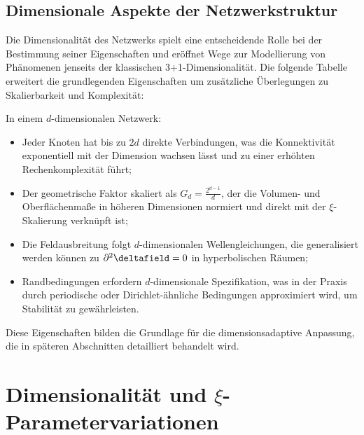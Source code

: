 \subsection{Dimensionale Aspekte der Netzwerkstruktur}
\label{subsec:dimensional_aspects}
Die Dimensionalität des Netzwerks spielt eine entscheidende Rolle bei der Bestimmung seiner Eigenschaften und eröffnet Wege zur Modellierung von Phänomenen jenseits der klassischen 3+1-Dimensionalität. Die folgende Tabelle erweitert die grundlegenden Eigenschaften um zusätzliche Überlegungen zu Skalierbarkeit und Komplexität:
\begin{overview}
	In einem $d$-dimensionalen Netzwerk:
	\begin{itemize}
		\item Jeder Knoten hat bis zu $2d$ direkte Verbindungen, was die Konnektivität exponentiell mit der Dimension wachsen lässt und zu einer erhöhten Rechenkomplexität führt;
		\item Der geometrische Faktor skaliert als $G_d = \frac{2^{d-1}}{d}$, der die Volumen- und Oberflächenmaße in höheren Dimensionen normiert und direkt mit der $\xi$-Skalierung verknüpft ist;
		\item Die Feldausbreitung folgt $d$-dimensionalen Wellengleichungen, die generalisiert werden können zu $\partial^2 \deltafield = 0$ in hyperbolischen Räumen;
		\item Randbedingungen erfordern $d$-dimensionale Spezifikation, was in der Praxis durch periodische oder Dirichlet-ähnliche Bedingungen approximiert wird, um Stabilität zu gewährleisten.
	\end{itemize}
\end{overview}
Diese Eigenschaften bilden die Grundlage für die dimensionsadaptive Anpassung, die in späteren Abschnitten detailliert behandelt wird.
\section{Dimensionalität und $\xi$-Parametervariationen}
\label{sec:dimensionality_xi}
